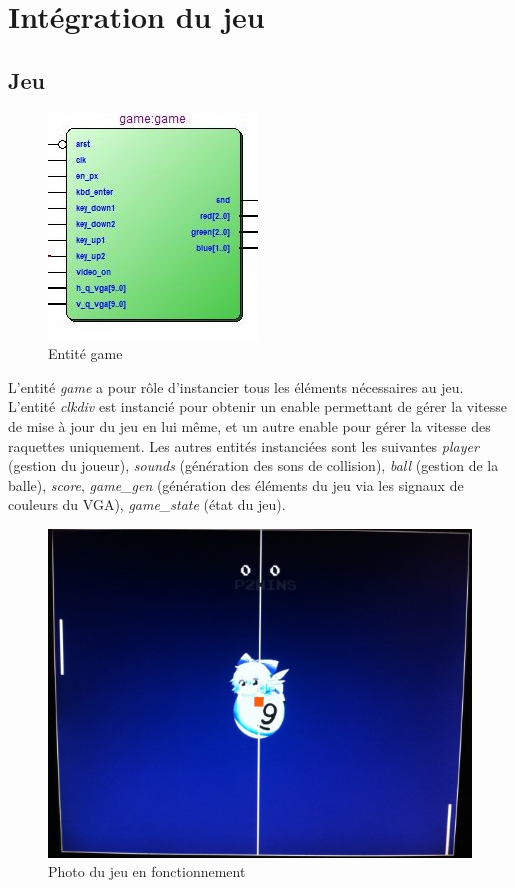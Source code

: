 \section{Intégration du jeu}
\subsection{Jeu}
\begin{figure}[h!]
	\centering
	\includegraphics[scale=1.0]{images/game.jpg}
	\caption{Entité game}
	\label{fig:game}
\end{figure}
L'entité \emph{game} a pour rôle d'instancier tous les éléments nécessaires au jeu. L'entité \emph{clkdiv} est instancié pour obtenir un enable permettant de gérer la vitesse de mise à jour du jeu en lui même, et un autre enable pour gérer la vitesse des raquettes uniquement. Les autres entités instanciées sont les suivantes \emph{player} (gestion du joueur), \emph{sounds} (génération des sons de collision), \emph{ball} (gestion de la balle), \emph{score}, \emph{game\_gen} (génération des éléments du jeu via les signaux de couleurs du VGA), \emph{game\_state} (état du jeu).
\begin{figure}[h!]
	\centering
	\includegraphics[scale=0.5]{images/IMG_1015.jpg}
	\caption{Photo du jeu en fonctionnement}
	\label{fig:photogame}
\end{figure}

